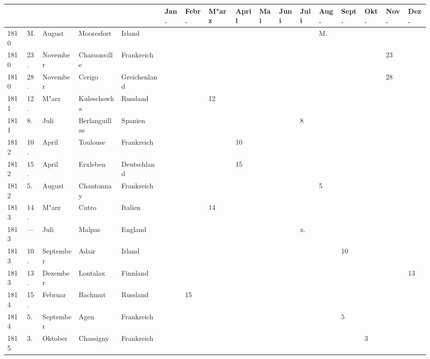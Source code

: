 \documentclass[a4paper, 8pt, oneside, polutonikogreek, german]{article}
\begin{document}
\begin{landscape}
\begin{table}[H]
    \footnotesize
    \centering
    \begin{longtable}{|p{5mm}|p{4mm}|p{13mm}|p{17mm}|p{17mm}|p{4mm}|p{6mm}|p{6mm}|p{6mm}|p{4mm}|p{5mm}|p{4mm}|p{5mm}|p{6mm}|p{5mm}|p{5mm}|p{5mm}|}
    \hline
         &  &  &  &  & Jan. & Febr. & M"arz & April & Mai & Juni & Juli & Aug. & Sept. & Okt. & Nov. & Dez. \\ \hline
        1810 & M. & August & Mooresfort & Irland & ~ & ~ & ~ & ~ & ~ & ~ & ~ & M. & ~ & ~ & ~ & ~ \\ \hline
        1810 & 23. & November & Charsonville & Frankreich & ~ & ~ & ~ & ~ & ~ & ~ & ~ & ~ & ~ & ~ & 23 & ~ \\ \hline
        1810 & 28. & November & Cerigo & Greichenland & ~ & ~ & ~ & ~ & ~ & ~ & ~ & ~ & ~ & ~ & 28 & ~ \\ \hline
        1811 & 12. & M"arz & Kuleschowka & Russland & ~ & ~ & 12 & ~ & ~ & ~ & ~ & ~ & ~ & ~ & ~ & ~ \\ \hline
        1811 & 8. & Juli & Berlanguillas & Spanien & ~ & ~ & ~ & ~ & ~ & ~ & 8 & ~ & ~ & ~ & ~ & ~ \\ \hline
        1812 & 10. & April & Toulouse & Frankreich & ~ & ~ & ~ & 10 & ~ & ~ & ~ & ~ & ~ & ~ & ~ & ~ \\ \hline
        1812 & 15. & April & Erxleben & Deutschland & ~ & ~ & ~ & 15 & ~ & ~ & ~ & ~ & ~ & ~ & ~ & ~ \\ \hline
        1812 & 5. & August & Chantonnay & Frankreich & ~ & ~ & ~ & ~ & ~ & ~ & ~ & 5 & ~ & ~ & ~ & ~ \\ \hline
        1813 & 14. & M"arz & Cutro & Italien & ~ & ~ & 14 & ~ & ~ & ~ & ~ & ~ & ~ & ~ & ~ & ~ \\ \hline
        1813 & --- & Juli & Malpas & England & ~ & ~ & ~ & ~ & ~ & ~ & x. & ~ & ~ & ~ & ~ & ~ \\ \hline
        1813 & 10. & September & Adair & Irland & ~ & ~ & ~ & ~ & ~ & ~ & ~ & ~ & 10 & ~ & ~ & ~ \\ \hline
        1813 & 13. & Dezember & Lontalax & Finnland & ~ & ~ & ~ & ~ & ~ & ~ & ~ & ~ & ~ & ~ & ~ & 13 \\ \hline
        1814 & 15. & Februar & Bachmut & Russland & ~ & 15 & ~ & ~ & ~ & ~ & ~ & ~ & ~ & ~ & ~ & ~ \\ \hline
        1814 & 5. & September & Agen & Frankreich & ~ & ~ & ~ & ~ & ~ & ~ & ~ & ~ & 5 & ~ & ~ & ~ \\ \hline
        1815 & 3. & Oktober & Chassigny & Frankreich & ~ & ~ & ~ & ~ & ~ & ~ & ~ & ~ & ~ & 3 & ~ & ~ \\ \hline

\end{longtable}
\end{table}
\end{landscape}
\end{document}
